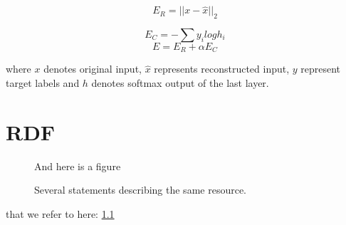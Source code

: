 \documentclass[a4paper,11pt]{kth-mag}
\begin{document}
\begin{equation}
E_R = ||x - \hat{x}||_2
\end{equation}

\begin{equation}
E_C = -\sum{y_{i}logh_{i}}
\end{equation}
\begin{equation}
E = E_R + \alpha E_C
\end{equation}

where $x$ denotes original input, $\hat{x}$ represents reconstructed input, $y$ represent target labels and $h$ denotes softmax output of the last layer.

\appendix
\addappheadtotoc
\chapter{RDF}

\begin{figure}[ht]
\begin{center}
And here is a figure
\caption{\small{Several statements describing the same resource.}}\label{RDF_4}
\end{center}
\end{figure}

that we refer to here: \ref{RDF_4}
\end{document}
